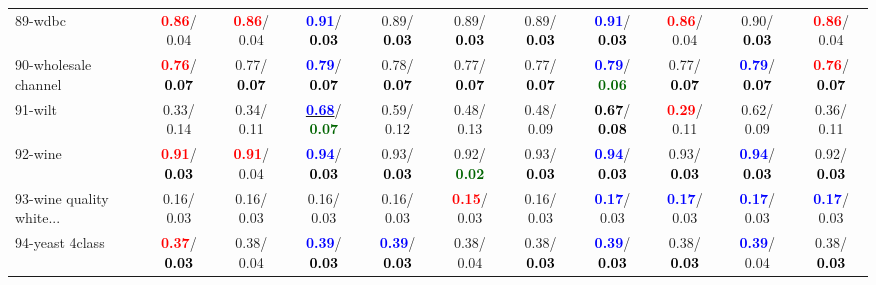 \begin{table}[h]
\begin{center}
{\begin{tabular}{lc|c|c|c|c|c|c|c|c|c}
89-wdbc & \textcolor{red}{\textbf{  0.86}}/  0.04 & \textcolor{red}{\textbf{  0.86}}/  0.04 & \textcolor{blue}{\textbf{  0.91}}/\textcolor{black}{\textbf{  0.03}} &   0.89/\textcolor{black}{\textbf{  0.03}} &   0.89/\textcolor{black}{\textbf{  0.03}} &   0.89/\textcolor{black}{\textbf{  0.03}} & \textcolor{blue}{\textbf{  0.91}}/\textcolor{black}{\textbf{  0.03}} & \textcolor{red}{\textbf{  0.86}}/  0.04 &   0.90/\textcolor{black}{\textbf{  0.03}} & \textcolor{red}{\textbf{  0.86}}/  0.04 \\
90-wholesale channel & \textcolor{red}{\textbf{  0.76}}/\textcolor{black}{\textbf{  0.07}} &   0.77/\textcolor{black}{\textbf{  0.07}} & \textcolor{blue}{\textbf{  0.79}}/\textcolor{black}{\textbf{  0.07}} &   0.78/\textcolor{black}{\textbf{  0.07}} &   0.77/\textcolor{black}{\textbf{  0.07}} &   0.77/\textcolor{black}{\textbf{  0.07}} & \textcolor{blue}{\textbf{  0.79}}/\textcolor{darkgreen}{\textbf{  0.06}} &   0.77/\textcolor{black}{\textbf{  0.07}} & \textcolor{blue}{\textbf{  0.79}}/\textcolor{black}{\textbf{  0.07}} & \textcolor{red}{\textbf{  0.76}}/\textcolor{black}{\textbf{  0.07}} \\
91-wilt &   0.33/  0.14 &   0.34/  0.11 & \underline{\textcolor{blue}{\textbf{  0.68}}}/\textcolor{darkgreen}{\textbf{  0.07}} &   0.59/  0.12 &   0.48/  0.13 &   0.48/  0.09 & \textcolor{black}{\textbf{  0.67}}/\textcolor{black}{\textbf{  0.08}} & \textcolor{red}{\textbf{  0.29}}/  0.11 &   0.62/  0.09 &   0.36/  0.11 \\
92-wine & \textcolor{red}{\textbf{  0.91}}/\textcolor{black}{\textbf{  0.03}} & \textcolor{red}{\textbf{  0.91}}/  0.04 & \textcolor{blue}{\textbf{  0.94}}/\textcolor{black}{\textbf{  0.03}} &   0.93/\textcolor{black}{\textbf{  0.03}} &   0.92/\textcolor{darkgreen}{\textbf{  0.02}} &   0.93/\textcolor{black}{\textbf{  0.03}} & \textcolor{blue}{\textbf{  0.94}}/\textcolor{black}{\textbf{  0.03}} &   0.93/\textcolor{black}{\textbf{  0.03}} & \textcolor{blue}{\textbf{  0.94}}/\textcolor{black}{\textbf{  0.03}} &   0.92/\textcolor{black}{\textbf{  0.03}} \\ \hline
93-wine quality white... &   0.16/  0.03 &   0.16/  0.03 &   0.16/  0.03 &   0.16/  0.03 & \textcolor{red}{\textbf{  0.15}}/  0.03 &   0.16/  0.03 & \textcolor{blue}{\textbf{  0.17}}/  0.03 & \textcolor{blue}{\textbf{  0.17}}/  0.03 & \textcolor{blue}{\textbf{  0.17}}/  0.03 & \textcolor{blue}{\textbf{  0.17}}/  0.03 \\
94-yeast 4class & \textcolor{red}{\textbf{  0.37}}/\textcolor{black}{\textbf{  0.03}} &   0.38/  0.04 & \textcolor{blue}{\textbf{  0.39}}/\textcolor{black}{\textbf{  0.03}} & \textcolor{blue}{\textbf{  0.39}}/\textcolor{black}{\textbf{  0.03}} &   0.38/  0.04 &   0.38/\textcolor{black}{\textbf{  0.03}} & \textcolor{blue}{\textbf{  0.39}}/\textcolor{black}{\textbf{  0.03}} &   0.38/\textcolor{black}{\textbf{  0.03}} & \textcolor{blue}{\textbf{  0.39}}/  0.04 &   0.38/\textcolor{black}{\textbf{  0.03}} \\\end{tabular}}\label{stratsALCKappa2aRFRedux}
\end{center}
\end{table}